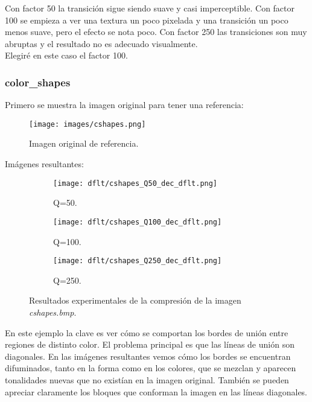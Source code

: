 \documentclass[12pt,a4paper]{article}
\begin{document}
Con factor 50 la transición sigue siendo suave y casi imperceptible. Con factor 100 se empieza a ver una textura un poco pixelada y una transición un poco menos suave, pero el efecto se nota poco. Con factor 250 las transiciones son muy abruptas y el resultado no es adecuado visualmente.\\

Elegiré en este caso el factor 100.

\subsubsection{color\_shapes}
Primero se muestra la imagen original para tener una referencia:
\begin{figure}[H]
    \centering
    \texttt{[image: images/cshapes.png]}
    \caption[Referencia - color\_shapes]{Imagen original de referencia.}
    
\end{figure}
    
    \vspace{0.5cm}

Imágenes resultantes:
\begin{figure}[H]
    
    \begin{subfigure}{0.30\textwidth}
        \centering
        \texttt{[image: dflt/cshapes\_Q50\_dec\_dflt.png]}
        \caption{Q=50.}
        
    \end{subfigure}
    \hfill
    \begin{subfigure}{0.30\textwidth}
        \centering
        \texttt{[image: dflt/cshapes\_Q100\_dec\_dflt.png]}
        \caption{Q=100.}
        
    \end{subfigure}
    \hfill
    \begin{subfigure}{0.30\textwidth}
        \centering
        \texttt{[image: dflt/cshapes\_Q250\_dec\_dflt.png]}
        \caption{Q=250.}
        
    \end{subfigure}
    
    \caption[Resultados experimentales - color\_shapes]{Resultados experimentales de la compresión de la imagen \textit{cshapes.bmp}.}
    
\end{figure}

En este ejemplo la clave es ver cómo se comportan los bordes de unión entre regiones de distinto color. El problema principal es que las líneas de unión son diagonales. En las imágenes resultantes vemos cómo los bordes se encuentran difuminados, tanto en la forma como en los colores, que se mezclan y aparecen tonalidades nuevas que no existían en la imagen original. También se pueden apreciar claramente los bloques que conforman la imagen en las líneas diagonales.\\
\end{document}
